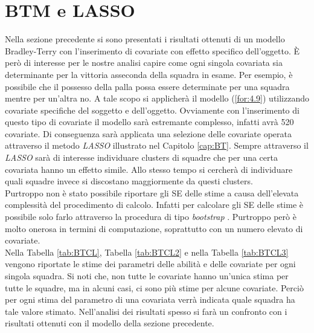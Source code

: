 \section{BTM e LASSO}
Nella sezione precedente si sono presentati i risultati ottenuti di un modello Bradley-Terry con l'inserimento di covariate con effetto specifico dell'oggetto. È però di interesse per le nostre analisi capire come ogni singola covariata sia determinante per la vittoria asseconda della squadra in esame. Per esempio, è possibile che il possesso della palla possa essere determinate per una squadra mentre per un'altra no. A tale scopo si applicherà il modello (\ref{for:4.9}) utilizzando covariate specifiche del soggetto e dell'oggetto. Ovviamente con l'inserimento di questo tipo di covariate il modello sarà estremante complesso, infatti avrà 520 covariate. Di conseguenza sarà applicata una selezione delle covariate operata attraverso il metodo \emph{LASSO} illustrato nel Capitolo \ref{cap:BT}. Sempre attraverso il \emph{LASSO} sarà di interesse individuare clusters di squadre che per una certa covariata hanno un effetto simile. Allo stesso tempo si cercherà di individuare quali squadre invece si discostano maggiormente da questi clusters.\\
Purtroppo non è stato possibile riportare gli SE delle stime a causa dell'elevata complessità del procedimento di calcolo. Infatti per calcolare gli SE delle stime è possibile solo farlo attraverso la procedura di tipo \emph{bootstrap} \autocite{henderson2005bootstrap}. Purtroppo però è molto onerosa in termini di computazione, soprattutto con un numero elevato di covariate.\\
Nella Tabella \ref{tab:BTCL}, Tabella \ref{tab:BTCL2} e nella Tabella \ref{tab:BTCL3} vengono riportate le stime dei parametri delle abilità e delle covariate per ogni singola squadra. Si noti che, non tutte le covariate hanno un’unica stima per tutte le squadre, ma in alcuni casi, ci sono più stime per alcune covariate. Perciò per ogni stima del parametro di una covariata verrà indicata quale squadra ha tale valore stimato. Nell'analisi dei risultati spesso si farà un confronto con i risultati ottenuti con il modello della sezione precedente.\\

